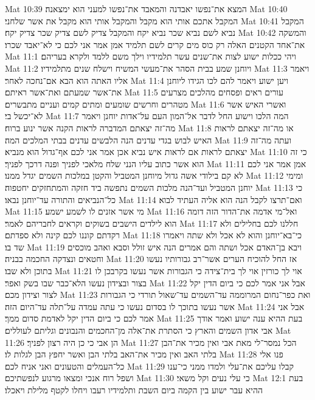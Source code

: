 Mat 10:39  המצא את־נפשו יאבדנה והמאבד את־נפשו למעני הוא ימצאנה׃
Mat 10:40  המקבל אתכם אותי הוא מקבל והמקבל אותי הוא מקבל את אשר שלחני׃
Mat 10:41  המקבל נביא לשם נביא שכר נביא יקח והמקבל צדיק לשם צדיק שכר צדיק יקח׃
Mat 10:42  והמשקה את־אחד הקטנים האלה רק כוס מים קרים לשם תלמיד אמן אמר אני לכם כי לא־יאבד שכרו׃
Mat 11:1  ויהי ככלות ישוע לצות את־שנים עשר תלמידיו וילך משם ללמד ולקרא בעריהם׃
Mat 11:2  ויוחנן שמע בבית הסהר את־מעשי המשיח וישלח שנים מתלמידיו׃
Mat 11:3  ויאמר אליו האתה הוא הבא אם־נחכה לאחר׃
Mat 11:4  ויען ישוע ויאמר להם לכו הגידו ליוחנן את־אשר שמעתם ואת־אשר ראיתם׃
Mat 11:5  עורים ראים ופסחים מהלכים מצרעים מטהרים וחרשים שומעים ומתים קמים ועניים מתבשרים׃
Mat 11:6  ואשרי האיש אשר לא־יכשל בי׃
Mat 11:7  המה הלכו וישוע החל לדבר אל־המון העם על־אדות יוחנן ויאמר מה־זה יצאתם המדברה לראות הקנה אשר ינוע ברוח׃
Mat 11:8  או מה־זה יצאתם לראות האיש לבוש בגדי עדנים הנה הלבשים עדנים בבתי המלכים המה׃
Mat 11:9  ועתה מה־זה יצאתם לראות אם לראות איש נביא אכן אמר אני לכם אף־גדול הוא מנביא׃
Mat 11:10  כי זה הוא אשר כתוב עליו הנני שלח מלאכי לפניך ופנה דרכך לפניך׃
Mat 11:11  אמן אמר אני לכם לא קם בילודי אשה גדול מיוחנן המטביל והקטן במלכות השמים יגדל ממנו׃
Mat 11:12  ומימי יוחנן המטביל ועד־הנה מלכות השמים נתפשה ביד חזקה והמתחזקים יחטפוה׃
Mat 11:13  כי כל־הנביאים והתורה עד־יוחנן נבאו׃
Mat 11:14  ואם־תרצו לקבל הנה הוא אליה העתיד לבוא׃
Mat 11:15  מי אשר אזנים לו לשמע ישמע׃
Mat 11:16  ואל־מי אדמה את־הדור הזה דומה הוא לילדים הישבים בשוקים וקראים לחבריהם לאמר׃
Mat 11:17  חללנו לכם בחלילים ולא רקדתם קוננו לכם קינה ולא ספדתם׃
Mat 11:18  כי־בא־יוחנן והוא לא אכל ולא שתה ויאמרו שד בו׃
Mat 11:19  ויבא בן־האדם אכל ושתה והם אמרים הנה איש זולל וסבא ואהב מוכסים וחטאים ונצדקה החכמה בבניה׃
Mat 11:20  אז החל להוכיח הערים אשר־רב גבורותיו נעשו בתוכן ולא שבו׃
Mat 11:21  אוי לך כורזין אוי לך בית־צידה כי הגבורות אשר נעשו בקרבכן לו בצור ובצידון נעשו הלא־כבר שבו בשק ואפר׃
Mat 11:22  אבל אני אמר לכם כי ביום הדין יקל לצור וצידון מכם׃
Mat 11:23  ואת כפר־נחום המרוממה עד־השמים עד־שאול תורדי כי הגבורות אשר נעשו בתוכך לו בסדום נעשו כי עתה עמדה על־תלה עד־היום הזה׃
Mat 11:24  אבל אני אמר לכם כי ביום הדין יקל לאדמת סדום ממך׃
Mat 11:25  בעת ההיא ענה ישוע ואמר אודך אבי אדון השמים והארץ כי הסתרת את־אלה מן־החכמים והנבונים וגליתם לעוללים׃
Mat 11:26  הן אבי כי כן היה רצון לפניך׃
Mat 11:27  הכל נמסר־לי מאת אבי ואין מכיר את־הבן בלתי האב ואין מכיר את־האב בלתי הבן ואשר יחפץ הבן לגלות לו׃
Mat 11:28  פנו אלי כל־העמלים והטעונים ואני אניח לכם׃
Mat 11:29  קבלו עליכם את־עלי ולמדו ממני כי־ענו ושפל רוח אנכי ומצאו מרגוע לנפשתיכם׃
Mat 11:30  כי עלי נעים וקל משאי׃
Mat 12:1  בעת ההיא עבר ישוע בין הקמה ביום השבת ותלמידיו רעבו ויחלו לקטף מלילת ויאכלו׃
